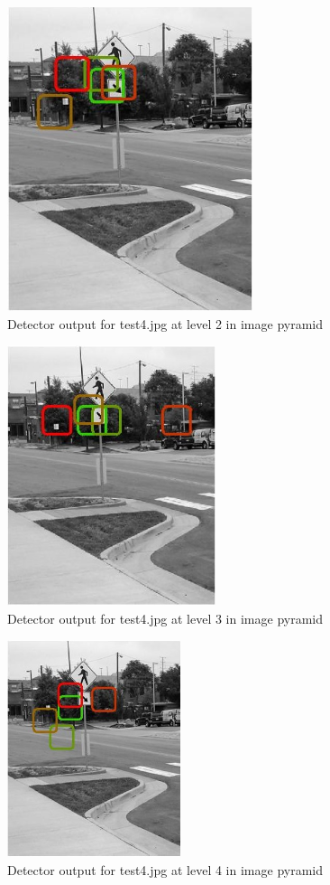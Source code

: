 \documentclass[11pt,psfig]{article}
\begin{document}
\begin{figure}[H]
\centering
\includegraphics[height=3.5in]{prob5b_plot2_level2.jpg}
\caption{Detector output for test4.jpg at level 2 in image pyramid}
\end{figure}

\begin{figure}[H]
\centering
\includegraphics[height=3in]{prob5b_plot2_level3.jpg}
\caption{Detector output for test4.jpg at level 3 in image pyramid}
\end{figure}

\begin{figure}[H]
\centering
\includegraphics[height=2.5in]{prob5b_plot2_level4.jpg}
\caption{Detector output for test4.jpg at level 4 in image pyramid}
\end{figure}
\end{document}
